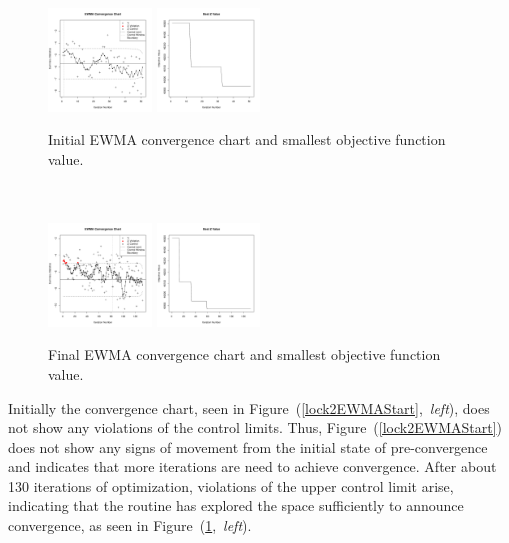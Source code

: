 \documentclass[12pt]{article}
\begin{document}
	\begin{figure}
	\includegraphics[width=0.245\textwidth]{./figures/ewmaConvChartLock240000Start.pdf}
	\includegraphics[width=0.245\textwidth]{./figures/bestZLock240000Start.pdf}
	\caption{Initial EWMA convergence chart and smallest objective function value. }
	\label{lock2EWMAStart}
	$~$\\\\
	\includegraphics[width=0.245\textwidth]{./figures/ewmaConvChartLock240000End.pdf}
	\includegraphics[width=0.245\textwidth]{./figures/bestZLock240000End.pdf}
	\caption{Final EWMA convergence chart and smallest objective function value. }
	\label{lock2EWMAEnd}
	\end{figure}
	
	Initially the convergence chart, seen in \mbox{Figure (\ref{lock2EWMAStart}, {\it left}),} does not show any violations of the control limits.
	Thus, \mbox{Figure (\ref{lock2EWMAStart})} does not show any signs of movement from the initial state of pre-convergence and indicates that more iterations are need to achieve convergence. 
	After about 130 iterations of optimization, violations of the upper control limit arise, indicating that the routine has explored the space \mbox{sufficiently} to announce convergence, as seen in \mbox{Figure (\ref{lock2EWMAEnd}, {\it left}).}
	
\end{document}
